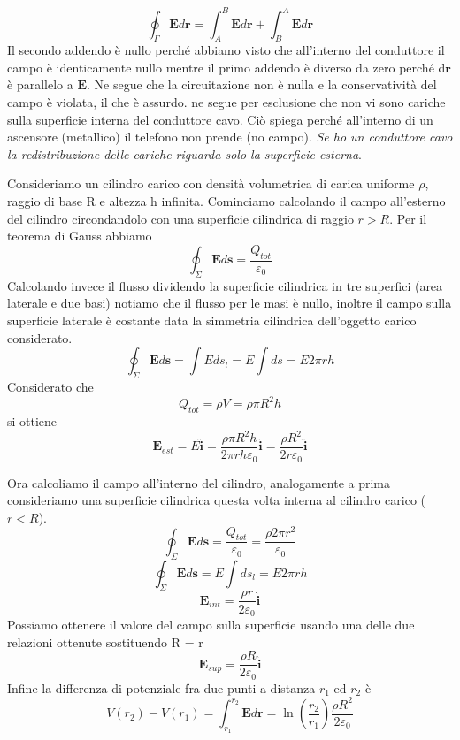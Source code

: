 \documentclass[
10pt, %
a4paper, %
oneside, %
headinclude,footinclude, %
BCOR5mm, %
]{scrartcl}
\begin{document}
\begin{enumerate}
\[\oint_{\Gamma}\mathbf{E}d\mathbf{r}= \int_{A}^{B}\mathbf{E}d\mathbf{r}+\int_{B}^{A}\mathbf{E}d\mathbf{r}\]
Il secondo addendo è nullo perché abbiamo visto che all'interno del conduttore il campo è identicamente nullo mentre il primo addendo è diverso da zero perché d$\mathbf{r}$ è parallelo a $\mathbf{E}$. Ne segue che la circuitazione non è nulla e la conservatività del campo è violata, il che è assurdo. ne segue per esclusione che non vi sono cariche sulla superficie interna del conduttore cavo. Ciò spiega perché all'interno di un ascensore (metallico) il telefono non prende (no campo). 
\textit{Se ho un conduttore cavo la redistribuzione delle cariche riguarda solo la superficie esterna}. 
\end{enumerate}
\begin{esercizio}
Consideriamo un cilindro carico con densità volumetrica di carica uniforme $\rho$, raggio di base R e altezza h infinita. Cominciamo calcolando il campo all'esterno del cilindro circondandolo con una superficie cilindrica di raggio \(r>R\). Per il teorema di Gauss abbiamo
\[\oint_{\Sigma}\mathbf{E}d\mathbf{s}=\frac{Q_{tot}}{\varepsilon_0}\]
Calcolando invece il flusso dividendo la superficie cilindrica in tre superfici (area laterale e due basi) notiamo che il flusso per le masi è nullo, inoltre il campo sulla superficie laterale è costante data la simmetria cilindrica dell'oggetto carico considerato.
\[\oint_{\Sigma}\mathbf{E}d\mathbf{s}=\int E ds_l = E\int ds = E2\pi r h\]
Considerato che
\[Q_{tot} = \rho V = \rho \pi R^2 h\]
si ottiene
\[\mathbf{E}_{est} = E \hat{\mathbf{i}} = \frac{\rho \pi R^2 h }{2\pi r h \varepsilon_0} \hat{\mathbf{i}}= \frac{\rho R^2 }{2 r \varepsilon_0}\hat{\mathbf{i}}\]
\end{esercizio}
Ora calcoliamo il campo all'interno del cilindro, analogamente a prima consideriamo una superficie cilindrica questa volta interna al cilindro carico (\(r<R\)). 
\[\oint_{\Sigma}\mathbf{E}d\mathbf{s}=\frac{Q_{tot}}{\varepsilon_0} = \frac{\rho 2 \pi r^2}{\varepsilon_0}\]
\[\oint_{\Sigma}\mathbf{E}d\mathbf{s}=E\int ds_l = E2\pi rh\]
\[\mathbf{E}_{int} = \frac{\rho r}{2\varepsilon_0}\hat{\mathbf{i}}\]
Possiamo ottenere il valore del campo sulla superficie usando una delle due relazioni ottenute sostituendo R = r
\[\mathbf{E}_{sup} = \frac{\rho R}{2\varepsilon_0}\hat{\mathbf{i}}\]
Infine la differenza di potenziale fra due punti a distanza \(r_1\) ed \(r_2\) è
\[V(r_2)-V(r_1) = \int_{r_1}^{r_2}\mathbf{E}d\mathbf{r}=\ln\left(\frac{r_2}{r_1}\right)\frac{\rho R^2}{2\varepsilon_0}\]
\end{document}
